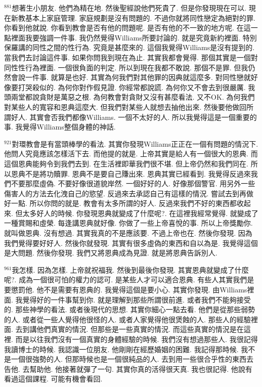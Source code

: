\documentclass{book}
\begin{document}
$^{881}$想著生小朋友.
他們為精在地.
然後聖經說他們死貴了.
但是你發現現在可以.
現在新教基本上家庭管理.
家庭規劃是沒有問題的.
不過你就將同性戀定為絕對的罪.
你看到他就說.
你看到教會是否有他的問題呢.
是否有他的不一致的地方呢.
在這一點裡面我要強調一件事.
我仍然覺得Williams所要討論的.
就是究竟新約裡面.
特別保羅講的同性之間的性行為.
究竟是甚麼來的.
這個我覺得Williams是沒有提到的.
當我們去討論這件事.
如果你問我到現在為止.
其實我都會覺得.
那個其實是一個對同性性行為裡面.
一個很負面的判定.
所以到現在我都不敢說.
那個不是罪.
但我仍然會說一件事.
就算是也好.
其實為何我們對其他罪的因典就這麼多.
對同性戀就好像要打哭殺似的.
為何你對作假見證.
你經常都說謊.
為何你又不會去到很嚴厲.
我頭兩堂都說貪財是萬惡之根.
為何教會對貪財又沒有甚麼看法.
又不OK.
為何我們對某些人的寬容和恩典這麼大.
但我們對某些人就想去抽他出來.
然後要他做回所謂好人.
其實會否我們都像Williams.
一個不太好的人.
所以我覺得這是一個重要的事.
我覺得Williams整個身體的神話.

$^{921}$對環教會是有當頭棒學的看法.
其實你發現Williams正正在一個有問題的情況下.
他問人究竟應該怎樣活下去.
而他提的就是.
上帝其實是給人有一個很大的恩典.
而這個恩典能夠令到我們去到.
在生活裡即華我們很不堪.
但上帝仍然和我們同在.
所以恩典不是將功贖罪.
恩典不是要自己賺出來.
恩典其實已經看到.
我覺得反過來我們不要那麼虛偽.
不要好像很道貌岸然.
一個好好的人.
好像那個警官.
用另外一些傷害人的方法去化洩自己的慾望.
反過來去承認自己有這樣的情況.
嘗試去到再做好一點.
所以你問的就是.
教會有太多所謂的好人.
反過來我們不好的東西都收起來.
但太多好人的時候.
你發現恩典就變成了什麼呢?.
在這裡我經常覺得.
就變成了一種賞賜和虛榮.
每逢講恩典就好像.
你做了一些上帝喜悅的事.
所以上帝獎勵你.
就叫做恩典.
沒有想過.
其實我真的不是應該要.
不過上帝也在.
然後你發現.
因為我們覺得要好好人.
然後你就發現.
其實有很多虛偽的東西和自以為是.
我覺得這個是大問題.
然後你發現.
我們又將恩典成為見證.
就是將恩典告訴別人.

$^{961}$我怎樣.
因為怎樣.
上帝就祝福我.
然後到最後你發現.
其實恩典就變成了什麼呢?.
成為一個很可怕的權力的認可.
是某些人才可以適合恩典.
有些人其實我們是要懲罰他.
他不是需要有恩典的.
我覺得這個是要小心.
其實你發現.
由Williams裡面.
我覺得好的一件事幫到你.
就是理解到那些所謂很前進.
或者我們不能夠接受的.
那些神學的看法.
或者後現代的思想.
其實你細心一點去看.
他們是從那些弱勢的人.
或者從一些人覺得他很怪的人.
或者人家覺得他很煲蝕的人.
那些人的經驗裡面.
去到講他們真實的情況.
但那些是一些真實的情況.
而這些真實的情況是在這裡.
而是以往我們沒有一個真實的身體經驗的時候.
我們沒有想過那些人.
我很記得我讀博士的時候.
我認識一位朋友.
他剛剛在經歷婚姻的困難.
我記得那時候.
我不是一個很強勢的人.
但那時候也是一個很純品的人.
去到用一些很合乎性的東西去告他.
去幫助他.
他接著就彈了一句.
其實你真的活得很天真.
我也很記得.
他說有看過這個課程.
可能有機會看回.
\end{document}
